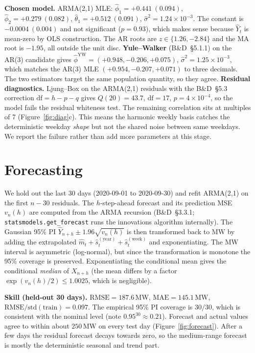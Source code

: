 \documentclass[11pt,a4paper]{article}
\begin{document}
\textbf{Chosen model.} ARMA(2,1) MLE: $\hat\phi_1 = +0.441~(0.094)$,
$\hat\phi_2 = +0.279~(0.082)$, $\hat\theta_1 = +0.512~(0.091)$,
$\hat\sigma^2 = 1.24\!\times\!10^{-3}$. The constant is $-0.0004~(0.004)$ and
not significant ($p = 0.93$), which makes sense because $\hat Y_t$ is
mean-zero by OLS construction. The AR roots are $z \in \{1.26, -2.84\}$ and
the MA root is $-1.95$, all outside the unit disc.
\textbf{Yule--Walker} (B\&D~\S5.1.1) on the AR(3) candidate gives
$\hat\phi^{\mathrm{YW}} = (+0.948, -0.206, +0.075)$,
$\hat\sigma^2 = 1.25\!\times\!10^{-3}$, which matches the AR(3) MLE
$(+0.954, -0.207, +0.071)$ to three decimals. The two estimators target the
same population quantity, so they agree.
\textbf{Residual diagnostics.} Ljung--Box on the ARMA(2,1) residuals with the
B\&D~\S5.3 correction $\mathrm{df} = h - p - q$ gives $Q(20) = 43.7$,
$\mathrm{df}=17$, $p = 4\!\times\!10^{-4}$, so the model fails the residual
whiteness test. The remaining correlation sits at multiples of 7
(Figure~\ref{fig:diag}c). This means the harmonic weekly basis catches the
deterministic weekday \emph{shape} but not the shared noise between same
weekdays. We report the failure rather than add more parameters at this
stage.

\section{Forecasting}
We hold out the last 30 days (2020-09-01 to 2020-09-30) and refit ARMA(2,1)
on the first $n-30$ residuals. The $h$-step-ahead forecast and its prediction
MSE $v_n(h)$ are computed from the ARMA recursion (B\&D~\S3.3.1;
\texttt{statsmodels.get\_forecast} runs the innovations algorithm internally).
The Gaussian 95\% PI $\hat Y_{n+h} \pm 1.96\sqrt{v_n(h)}$ is then transformed
back to MW by adding the extrapolated $\hat m_t + \hat s_t^{(\mathrm{year})}
+ \hat s_t^{(\mathrm{week})}$ and exponentiating. The MW interval is
asymmetric (log-normal), but since the transformation is monotone the 95\%
coverage is preserved. Exponentiating the conditional mean gives the
conditional \emph{median} of $X_{n+h}$ (the mean differs by a factor
$\exp(v_n(h)/2) \leq 1.0025$, which is negligible).

\textbf{Skill (held-out 30 days).}
$\mathrm{RMSE} = 187.6$\,MW, $\mathrm{MAE} = 145.1$\,MW,
$\mathrm{RMSE}/\mathrm{std}(\mathrm{train}) = 0.097$. The empirical 95\% PI
coverage is $30/30$, which is consistent with the nominal level (note
$0.95^{30} \approx 0.21$). Forecast and actual values agree to within about
$250$\,MW on every test day (Figure~\ref{fig:forecast}). After a few days
the residual forecast decays towards zero, so the medium-range forecast is
mostly the deterministic seasonal and trend part.
\end{document}
